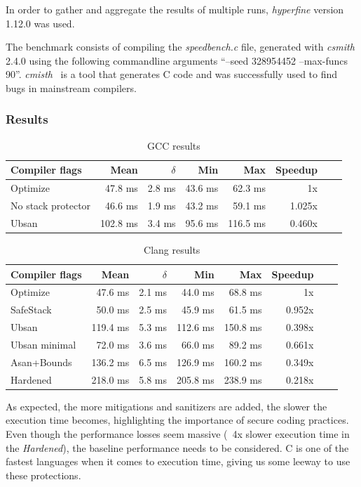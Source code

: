 \documentclass{article}
\begin{document}
In order to gather and aggregate the results of multiple runs, \emph{hyperfine} version 1.12.0 was used.

The benchmark consists of compiling the \emph{speedbench.c} file, generated with \emph{csmith} 2.4.0 using the following commandline arguments ``--seed 328954452 --max-funcs 90''. \emph{cmisth}~\cite{csmith} is a tool that generates C code and was successfully used to find bugs in mainstream compilers.

\subsubsection{Results}
\begin{table}[H]
\centering
\begin{tabular}{|l|r|r|r|r|r|r|r|}
\hline
Compiler flags & Mean & $\delta$ & Min & Max & Speedup \\
\hline
 Optimize &  47.8 ms & 2.8 ms & 43.6 ms & 62.3 ms & 1x \\
 No stack protector&  46.6 ms & 1.9 ms  & 43.2 ms  &  59.1 ms & 1.025x \\
 Ubsan &  102.8 ms & 3.4 ms & 95.6 ms  & 116.5 ms & 0.460x \\
\hline
\end{tabular}
\caption{GCC results}
\label{table:gcc}
\end{table}

\begin{table}[H]
\centering
\begin{tabular}{|l|r|r|r|r|r|r|r|}
\hline
Compiler flags & Mean & $\delta$ & Min & Max & Speedup \\
\hline
  Optimize &  47.6 ms & 2.1 ms & 44.0 ms & 68.8 ms & 1x \\
  SafeStack &  50.0 ms &  2.5 ms & 45.9 ms & 61.5 ms & 0.952x \\
  Ubsan &  119.4 ms & 5.3 ms &  112.6 ms & 150.8 ms & 0.398x \\
  Ubsan minimal & 72.0 ms & 3.6 ms &  66.0 ms& 89.2 ms & 0.661x \\
  Asan+Bounds &  136.2 ms &  6.5 ms&   126.9 ms & 160.2 ms & 0.349x \\
  Hardened & 218.0 ms & 5.8 ms & 205.8 ms & 238.9 ms & 0.218x \\
\hline
\end{tabular}
\caption{Clang results}
\label{table:clang}
\end{table}

As expected, the more mitigations and sanitizers are added, the slower the execution time becomes, highlighting the importance of secure coding practices. Even though the performance losses seem massive (~4x slower execution time in the \emph{Hardened}), the baseline performance needs to be considered. C is one of the fastest languages when it comes to execution time, giving us some leeway to use these protections.
\end{document}
